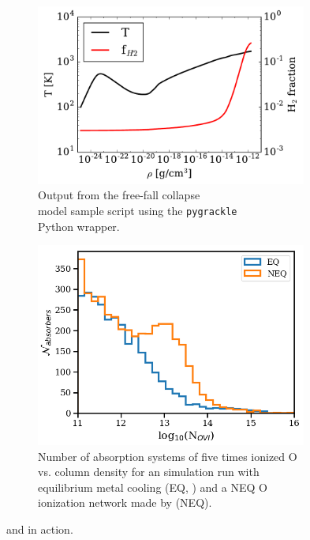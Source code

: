 \begin{figure}
\centering
\begin{subfigure}{.48\textwidth}
  \centering
  \includegraphics[width=0.98\textwidth]{figures/freefall.pdf}
  \caption{Output from the free-fall collapse\\ model sample script
    using the \texttt{pygrackle}\\Python wrapper.}
  \label{fig:freefall}
\end{subfigure}%
\begin{subfigure}{.42\textwidth}
  \centering
  \includegraphics[width=0.98\textwidth]{figures/unmatched_absorbers.png}
  \caption{Number of absorption systems of five times
    ionized O vs. column density for an \enzo{} simulation run
    with equilibrium metal cooling (EQ, \grackle{}) and a NEQ O
    ionization network made by \dengo{} (NEQ).}
  \label{fig:dengo}
\end{subfigure}%
\vspace*{-0.5\baselineskip}
\caption{\grackle{} and \dengo{} in action.}
\label{fig:evolve}
\vspace*{-1\baselineskip}
\end{figure}

